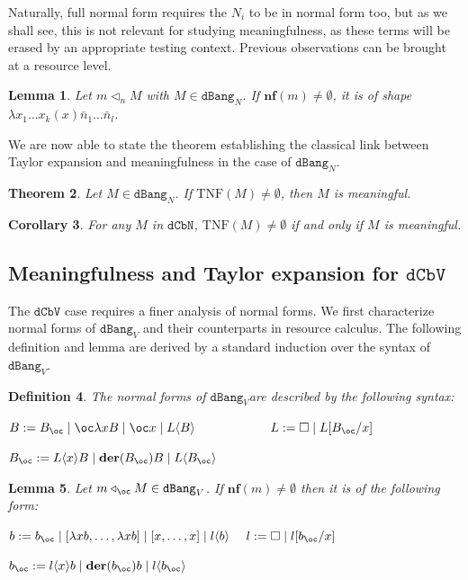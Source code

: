 \documentclass[10pt,a4paper]{article}
\newtheorem{theorem}{Theorem}
\newtheorem{lemma}[theorem]{Lemma}
\newtheorem{corollary}[theorem]{Corollary}
\newtheorem{definition}[theorem]{Definition}
\newcommand{\<}{\langle}
\renewcommand{\>}{\rangle}
\newcommand{\der}[1]{\ensuremath{\mathbf{der}(#1)}}
\newcommand{\dcbn}{\ensuremath{\mathtt{dCbN}}}
\newcommand{\dcbv}{\ensuremath{\mathtt{dCbV}}}
\newcommand{\dbang}{\ensuremath{\mathtt{dBang}}}
\newcommand{\dbangv}{\ensuremath{\dbang_V}}
\newcommand{\dbangn}{\ensuremath{\dbang_N}}
\newcommand{\nf}[1]{\mathbf{nf}(#1)}
\newcommand{\app}{\triangleleft_\oc} %
\newcommand{\appn}{\triangleleft_n} %
\newcommand{\taylornf}[1]{\ensuremath{\text{TNF}(#1)}}
\begin{document}
Naturally, full normal form requires the $N_i$ to be in normal form too, but as
we shall see, this is not relevant for studying meaningfulness, as these terms
will be erased by an appropriate testing context. 
Previous observations can be brought at a resource level.
\begin{lemma}\label{lem:dbangn_nf}
	Let $m\appn M$ with $M\in\dbangn$. If $\nf m\neq\emptyset$, it is of shape $\lambda
	x_1\dots x_k(x)\bar n_1\dots \bar n_l$.
\end{lemma}

We are now able to state the theorem establishing the classical link between Taylor
expansion and meaningfulness in the case of $\dbangn$.
\begin{theorem}\label{thm:dbangn_tnf}
	Let $M\in\dbangn$. If $\taylornf M\neq\emptyset$, then $M$ is
	meaningful.
\end{theorem}

\begin{corollary}\label{cor:dcbn_meaningful}
	For any $M$ in \dcbn, $\taylornf M\neq\emptyset$ if and only if $M$ is
	meaningful.
\end{corollary}

\subsection{Meaningfulness and Taylor expansion for \dcbv}
The \dcbv{} case requires a finer analysis of normal forms. 
We first characterize normal forms of $\dbangv$ and their counterparts in resource
calculus. The following definition and lemma are derived by a standard induction over the
syntax of $\dbangv$.

\begin{definition}\label{def:syntax_nf_dbangv}
	The normal forms of \dbangv are described by the following syntax:

	$B:=B_\oc\mid\oc\lambda xB\mid \oc x\mid L\<B\> \qquad\qquad\qquad L:= \square\mid L[B_\oc/x]$

	$B_\oc :=L\<x\>B\mid \der{B_\oc}B\mid L\<B_\oc\>$


\end{definition}

\begin{lemma}\label{lem:syntax_nf_dbangvres}
	Let $m\app M\in\dbangv$. If $\nf m\neq \emptyset$ then it is of the
	following form:

	$b:= b_\oc \mid [\lambda xb,\dots ,\lambda xb]\mid [x,\dots ,x]\mid l\<b\> \quad~ l:= \square\mid l[b_\oc/x]$

	$b_\oc :=l\<x\>b\mid \der{b_\oc}b\mid l\<b_\oc\>$

	
\end{lemma}
\end{document}
